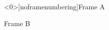 \documentclass{beamer}
\begin{document}
  \begin{frame}<0>[noframenumbering]{Frame A}
  \end{frame}

  \begin{frame}{Frame B}
  \end{frame}
\end{document}
